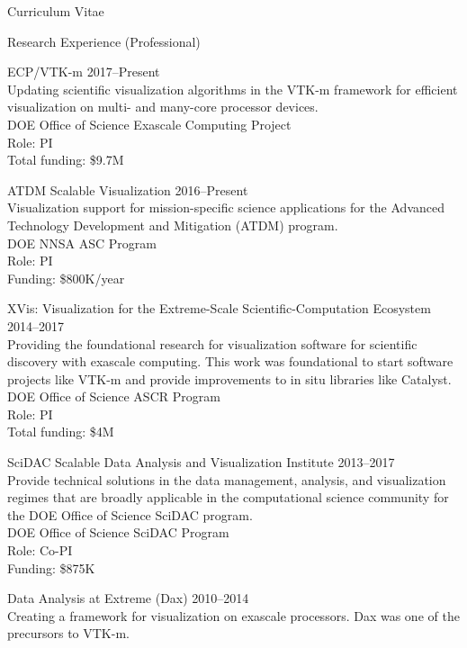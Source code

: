\documentclass{article}
\begin{document}
\begin{cv}{Curriculum Vitae}
    \begin{cvlist}{Research Experience (Professional)}
    \item[ECP/VTK-m]\hfill 2017--Present\\
      Updating scientific visualization algorithms in the VTK-m framework for efficient visualization on multi- and many-core processor devices.\\
      DOE Office of Science Exascale Computing Project\\
      Role: PI\\
      Total funding: \$9.7M %
    \item[ATDM Scalable Visualization]\hfill 2016--Present\\
      Visualization support for mission-specific science applications for the Advanced Technology Development and Mitigation (ATDM) program.\\
      DOE NNSA ASC Program\\
      Role: PI\\
      Funding: \$800K/year
    \item[XVis: Visualization for the Extreme-Scale Scientific-Computation Ecosystem]\hfill 2014--2017\\
      Providing the foundational research for visualization software for scientific discovery with exascale computing. This work was foundational to start software projects like \mbox{VTK-m} and provide improvements to in situ libraries like Catalyst.
      DOE Office of Science ASCR Program\\
      Role: PI \\
      Total funding: \$4M
    \item[SciDAC Scalable Data Analysis and Visualization Institute]\hfill 2013--2017\\
      Provide technical solutions in the data management, analysis, and
      visualization regimes that are broadly applicable in the
      computational science community for the DOE Office of Science SciDAC program.\\
      DOE Office of Science SciDAC Program\\
      Role: Co-PI\\
      Funding: \$875K
    \item[Data Analysis at Extreme (Dax)]\hfill 2010--2014\\
      Creating a framework for visualization on exascale processors. Dax was one of the precursors to \mbox{VTK-m}.\\

\end{cvlist}
\end{cv}
\end{document}
